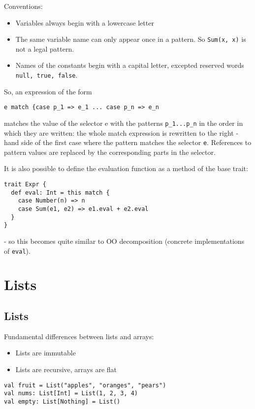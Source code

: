 \documentclass{scrartcl}
\begin{document}
Conventions:
\begin{itemize}
\item Variables always begin with a lowercase letter
\item The same variable name can only appear once in a pattern. So
  \lstinline|Sum(x, x)| is not a legal pattern.  
\item Names of the constants begin with a capital letter, excepted reserved
  words \lstinline|null, true, false|.
\end{itemize}

So, an expression of the form 
\begin{lstlisting}
e match {case p_1 => e_1 ... case p_n => e_n
\end{lstlisting}
matches the value of the selector e with the patterns \lstinline|p_1...p_n| in
the order in which they are written: the whole match expression is rewritten to
the right - hand side of the first case where the pattern matches the selector
\lstinline|e|. References to pattern values are replaced by the corresponding
parts in the selector.

It is also possible to define the evaluation function as a method of the base
trait:
\begin{lstlisting}
trait Expr {
  def eval: Int = this match {
    case Number(n) => n
    case Sum(e1, e2) => e1.eval + e2.eval
  }
}
\end{lstlisting}
- so this becomes quite similar to OO decomposition (concrete implementations of
\lstinline|eval|). 

\section{Lists}
\label{sec:Lists}
\subsection{Lists}
\label{sec:Listsss}

Fundamental differences between lists and arrays:
\begin{itemize}
\item Lists are immutable 
\item Lists are recursive, arrays are flat
\end{itemize}

\begin{lstlisting}
val fruit = List("apples", "oranges", "pears")
val nums: List[Int] = List(1, 2, 3, 4)
val empty: List[Nothing] = List()
\end{lstlisting}
\end{document}
